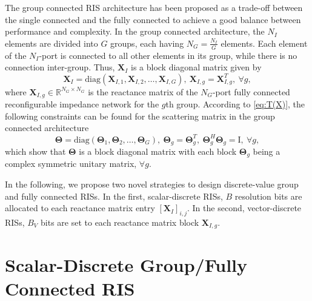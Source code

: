 \documentclass[twocolumn,10pt]{IEEEtran}
\begin{document}
The group connected RIS architecture has been proposed as a trade-off between the single connected and the fully connected to achieve a good balance between performance and complexity.
In the group connected architecture, the $N_{I}$ elements are divided into $G$ groups, each having $N_{G}=\frac{N_{I}}{G}$ elements.
Each element of the $N_{I}$-port is connected to all other elements in its group, while there is no connection inter-group. 
Thus, $\mathbf{X}_{I}$ is a block diagonal matrix given by
\begin{equation}
\mathbf{X}_{I}=\mathrm{diag}\left(\mathbf{X}_{I,1},\mathbf{X}_{I,2},\ldots,\mathbf{X}_{I,G}\right),\:\mathbf{X}_{I,g}=\mathbf{X}_{I,g}^{T},\:\forall g,\label{eq:X group}
\end{equation}
where $\mathbf{X}_{I,g}\in\mathbb{R}^{N_{G}\times N_{G}}$ is the reactance matrix of the $N_{G}$-port fully connected reconfigurable impedance network for the $g$th group.
According to \eqref{eq:T(X)}, the following constraints can be found for the scattering matrix in the group connected architecture
\begin{equation}
\boldsymbol{\Theta}=\mathrm{diag}\left(\boldsymbol{\Theta}_{1},\boldsymbol{\Theta}_{2},\ldots,\boldsymbol{\Theta}_{G}\right),\:\boldsymbol{\Theta}_{g}=\boldsymbol{\Theta}_{g}^{T},\:\boldsymbol{\Theta}_{g}^{H}\boldsymbol{\Theta}_{g}=\boldsymbol{\mathrm{I}},\:\forall g,\label{eq:T group}
\end{equation}
which show that $\boldsymbol{\Theta}$ is a block diagonal matrix with each block $\boldsymbol{\Theta}_{g}$ being a complex symmetric unitary matrix, $\forall g$.


In the following, we propose two novel strategies to design discrete-value group and fully connected RISs.
In the first, scalar-discrete RISs, $B$ resolution bits are allocated to each reactance matrix entry $\left[\mathbf{X}_I\right]_{i,j}$.
In the second, vector-discrete RISs, $B_V$ bits are set to each reactance matrix block $\mathbf{X}_{I,g}$.

\section{Scalar-Discrete Group/Fully Connected RIS}
\label{sec:scalar-discrete}
\end{document}
